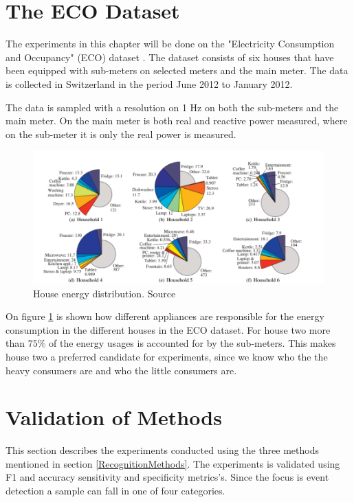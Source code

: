 \section{The ECO Dataset}
The experiments in this chapter will be done on the "Electricity Consumption and Occupancy" (ECO) dataset \citep{RefWorks:26}\citep{RefWorks:27}. The dataset consists of six houses that have been equipped with sub-meters on selected meters and the main meter. The data is collected in Switzerland in the period June 2012 to January 2012. 

The data is sampled with a resolution on 1 Hz on both the sub-meters and the main meter. On the main meter is both real and reactive power measured, where on the sub-meter it is only the real power is measured. 

\begin{figure}[H]
\centering
\includegraphics[width=1\textwidth]{billeder/ECOHouses.png}
\caption{House energy distribution. Source \citep{RefWorks:26}}
\label{fig:EHD}
\end{figure}

On figure \ref{fig:EHD} is shown how different appliances are responsible for the energy consumption in the different houses in the ECO dataset. For house two more than $75\%$ of the energy usages is accounted for by the sub-meters. This makes house two a preferred candidate for experiments, since we know who the the heavy consumers are and who the little consumers are.  

\section{Validation of Methods} 
This section describes the experiments conducted using the three methods mentioned in section \ref{RecognitionMethods}. The experiments is validated using F1 and accuracy sensitivity and specificity metrics's. Since the focus is event detection a sample can fall in one of four categories. 

